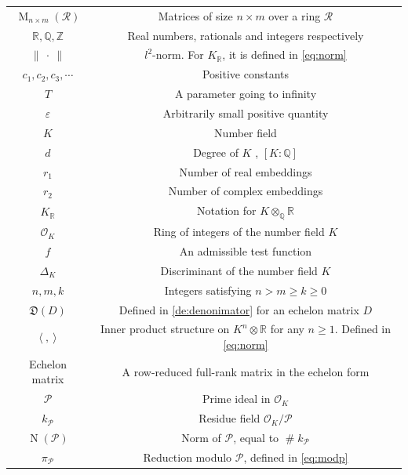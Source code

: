\documentclass{amsart}
\theoremstyle{definition}
\theoremstyle{remark}
\newcommand{\OK}{\mathcal{O}_K}
\newcommand{\KR}{K_\mathbb{R}}
\DeclareMathOperator{\M}{M}
\DeclareMathOperator{\card}{\texttt{\#}}
\DeclareMathOperator{\N}{N}
\begin{document}
    \begin{center}
        \begin{tabular}{ c c }
            $\M_{n \times m}(\mathcal{R})$ & Matrices of size $n \times m$ over a ring $\mathcal{R}$ \\ 
            $\mathbb{R},\mathbb{Q},\mathbb{Z}$ & Real numbers, rationals and integers respectively \\ 
            $\|~\cdot~\|$ &  $l^{2}$-norm. For $\KR$, it is defined in \cref{eq:norm}\\ 
            $c_1,c_2,c_3, \cdots$ & Positive constants  \\
            $T$ & A parameter going to infinity \\ 
            $\varepsilon$ & Arbitrarily small positive quantity \\
            $K$ & Number field  \\ 
            $d$ & Degree of $K$ , $[K:\mathbb{Q}]$  \\  
            $r_{1}$ & Number of real embeddings      \\
            $r_{2}$ &  Number of complex embeddings \\
            $\KR$ & Notation for $K \otimes_{\mathbb{Q}} \mathbb{R}$ \\
            $\OK$ & Ring of integers of the number field $K$ \\
            $f$ & An admissible test function \\
            $\Delta_{K}$ & Discriminant of the number field $K$ \\
            $n,m,k$ & Integers satisfying $n > m \geq k \geq 0$ \\
            $\mathfrak{D}(D)$ &  Defined in \cref{de:denonimator} for an echelon matrix $D$ \\
            $\langle\ , \ \rangle$ & Inner product structure on $K^{n} \otimes \mathbb{R}$ for any $n \geq 1$. Defined in \cref{eq:norm} \\
            Echelon matrix & A row-reduced full-rank matrix in the echelon form \\
            $\mathcal{P}$ & Prime ideal in $\OK$ \\ 
            $k_{\mathcal{P}}$ & Residue field $\OK/\mathcal{P}$ \\
            $\N(\mathcal{P})$ & Norm of $\mathcal{P}$, equal to $\card k_{\mathcal{P}}$ \\ 
            $\pi_{\mathcal{P}}$ & Reduction modulo $\mathcal{P}$, defined in \cref{eq:modp} \\

\end{tabular}
\end{center}
\end{document}
